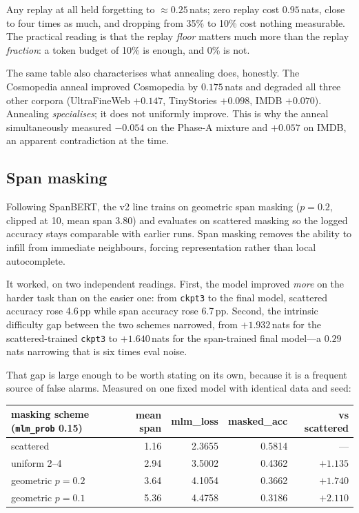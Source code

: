 \documentclass[11pt,a4paper]{article}
\newcommand{\nats}[1]{\ensuremath{#1}\,nats}
\begin{document}
Any replay at all held forgetting to $\approx$\nats{0.25}; zero replay cost \nats{0.95}, close
to four times as much, and dropping from 35\% to 10\% cost nothing measurable. The practical
reading is that the replay \emph{floor} matters much more than the replay \emph{fraction}: a
token budget of 10\% is enough, and 0\% is not.

The same table also characterises what annealing does, honestly. The Cosmopedia anneal improved
Cosmopedia by \nats{0.175} and degraded all three other corpora (UltraFineWeb $+0.147$,
TinyStories $+0.098$, IMDB $+0.070$). Annealing \emph{specialises}; it does not uniformly
improve. This is why the anneal simultaneously measured $-0.054$ on the Phase-A mixture and
$+0.057$ on IMDB, an apparent contradiction at the time.

\subsection{Span masking}

Following SpanBERT, the v2 line trains on geometric span masking ($p{=}0.2$, clipped at 10,
mean span 3.80) and evaluates on scattered masking so the logged accuracy stays comparable with
earlier runs. Span masking removes the ability to infill from immediate neighbours, forcing
representation rather than local autocomplete.

It worked, on two independent readings. First, the model improved \emph{more} on the harder
task than on the easier one: from \texttt{ckpt3} to the final model, scattered accuracy rose
4.6\,pp while span accuracy rose 6.7\,pp. Second, the intrinsic difficulty gap between the two
schemes narrowed, from \nats{{+}1.932} for the scattered-trained \texttt{ckpt3} to
\nats{{+}1.640} for the span-trained final model---a \nats{0.29} narrowing that is six times
eval noise.

That gap is large enough to be worth stating on its own, because it is a frequent source of
false alarms. Measured on one fixed model with identical data and seed:

\begin{center}\small
\begin{tabular}{lrrrr}
\toprule
masking scheme (\texttt{mlm\_prob} 0.15) & mean span & mlm\_loss & masked\_acc & vs scattered \\
\midrule
scattered            & 1.16 & 2.3655 & 0.5814 & --- \\
uniform 2--4         & 2.94 & 3.5002 & 0.4362 & $+1.135$ \\
geometric $p{=}0.2$  & 3.64 & 4.1054 & 0.3662 & $\mathbf{+1.740}$ \\
geometric $p{=}0.1$  & 5.36 & 4.4758 & 0.3186 & $+2.110$ \\
\bottomrule
\end{tabular}
\end{center}
\end{document}
